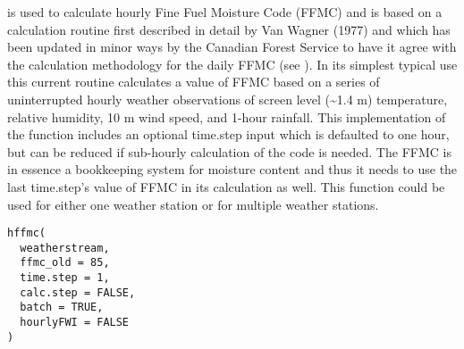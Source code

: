 \documentclass[a4paper]{book}
\begin{document}
\begin{Description}\relax
{} is used to calculate hourly Fine Fuel Moisture Code (FFMC) and
is based on a calculation routine first described in detail by Van Wagner
(1977) and which has been updated in minor ways by the Canadian Forest
Service to have it agree with the calculation methodology for the daily FFMC
(see ).  In its simplest typical use this current routine
calculates a value of FFMC based on a series of uninterrupted hourly weather
observations of screen level (\textasciitilde{}1.4 m) temperature, relative humidity, 10 m
wind speed, and 1-hour rainfall. This implementation of the function
includes an optional time.step input which is defaulted to one hour, but can
be reduced if sub-hourly calculation of the code is needed.  The FFMC is in
essence a bookkeeping system for moisture content and thus it needs to use
the last time.step's value of FFMC in its calculation as well.  This
function could be used for either one weather station or for multiple
weather stations.
\end{Description}
%
\begin{Usage}
\begin{verbatim}
hffmc(
  weatherstream,
  ffmc_old = 85,
  time.step = 1,
  calc.step = FALSE,
  batch = TRUE,
  hourlyFWI = FALSE
)
\end{verbatim}
\end{Usage}
%
\end{document}
